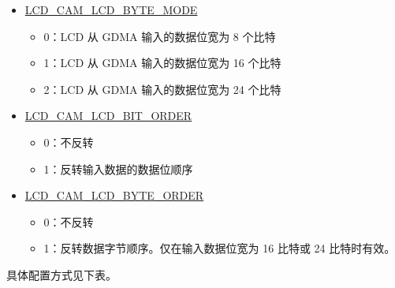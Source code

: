 \documentclass[main\_\_CN.tex]{subfiles}
\begin{document}
\begin{itemize}
    \item \hyperref[fielddesc:LCDCAMLCDBYTEMODE]{LCD\_CAM\_LCD\_BYTE\_MODE}
    \begin{itemize}
        \item 0：LCD 从 GDMA 输入的数据位宽为 8 个比特
        \item 1：LCD 从 GDMA 输入的数据位宽为 16 个比特
        \item 2：LCD 从 GDMA 输入的数据位宽为 24 个比特
    \end{itemize}
    \item \hyperref[fielddesc:LCDCAMLCDBITORDER]{LCD\_CAM\_LCD\_BIT\_ORDER}
    \begin{itemize}
        \item 0：不反转
        \item 1：反转输入数据的数据位顺序
    \end{itemize}
    \item \hyperref[fielddesc:LCDCAMLCDBYTEORDER]{LCD\_CAM\_LCD\_BYTE\_ORDER}
    \begin{itemize}
        \item 0：不反转
        \item 1：反转数据字节顺序。仅在输入数据位宽为 16 比特或 24 比特时有效。
    \end{itemize}

\end{itemize}

具体配置方式见下表。
\end{document}
